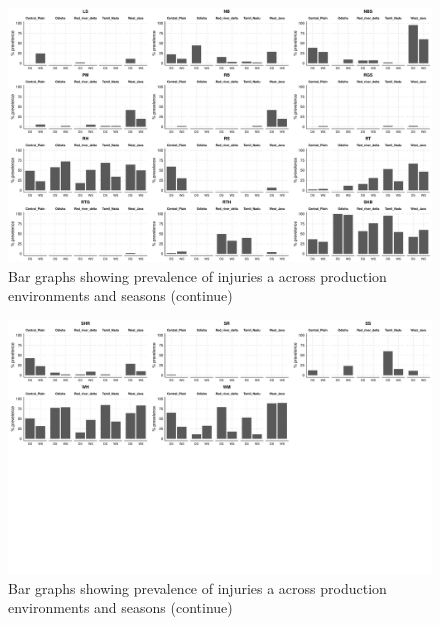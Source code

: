     \begin{landscape}\begin{figure}\centering\includegraphics[height = 1\textwidth]{figures/barplot2.pdf}
\caption{Bar graphs showing  prevalence of injuries a across production environments and seasons (continue)}
\label{fig:barplot2}
\end{figure}\end{landscape} 

    
    \begin{landscape}\begin{figure}\centering\includegraphics[height = 1\textwidth]{figures/barplot3.pdf}\caption{Bar graphs showing  prevalence of injuries a across production environments and seasons (continue)} \label{fig:barplot3} \end{figure}  \end{landscape} 

